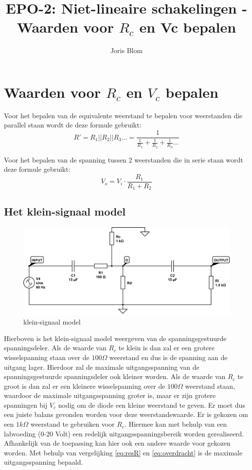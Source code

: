 \documentclass{report}
\title{EPO-2: Niet-lineaire schakelingen - Waarden voor $R_c$ en Vc bepalen}
\author{Joris Blom}
\begin{document}
\chapter{Waarden voor $R_c$ en $V_c$ bepalen}
\label{ch:Waarden voor $R_c$ en $V_c$ bepalen}
Voor het bepalen van de equivalente weerstand te bepalen voor weerstanden die parallel staan wordt de deze formule gebruikt:
\begin{equation}
\label{eq:resR}
R' = R_1||R_2||R_3... = \frac{1}{\frac{1}{R_1}+\frac{1}{R_2}+\frac{1}{R_3}...}
\end{equation}

\noindent Voor het bepalen van de spanning tussen 2 weerstanden die in serie staan wordt deze formule gebruikt:
\begin{equation}
\label{eq:overdracht}
V_o =V_i\cdot \frac{R_1}{R_1+R_2}
\end{equation}

\section{Het klein-signaal model}
\label{ch:Het klein-signaal model}
\begin{figure}[h]
\centering
\includegraphics[width=\textwidth]{Small-signal-model.png}

\caption{klein-signaal model}
\end{figure}
Hierboven is het klein-signaal model weergeven van de spanningsgestuurde spanningsdeler. Als de waarde van $R_c$ te klein is dan zal er een grotere wisselspanning staan over de $100\Omega$ weerstand en dus is de spanning aan de uitgang lager. Hierdoor zal de maximale uitgangsspanning van de spanningsgestuurde spanningsdeler ook kleiner worden. Als de waarde van $R_c$ te groot is dan zal er een kleinere wisselspanning over de $100\Omega$ weerstand staan, waardoor de maximale uitgangsspanning groter is, maar er zijn grotere spanningen bij $V_c$ nodig om de diode een kleine weerstand te geven. Er moet dus een juiste balans gevonden worden voor deze weerstandswaarde. Er is gekozen om een $1k\Omega$ weerstand te gebruiken voor $R_c$. Hiermee kan met behulp van een labvoeding (0-20 Volt) een redelijk uitgangsspanningsbereik worden gerealiseerd.  Afhankelijk van de toepassing kan hier ook een andere waarde voor gekozen worden. Met behulp van vergelijking \ref{eq:resR} en \ref{eq:overdracht} is de maximale uitgangsspanning bepaald.
\end{document}
